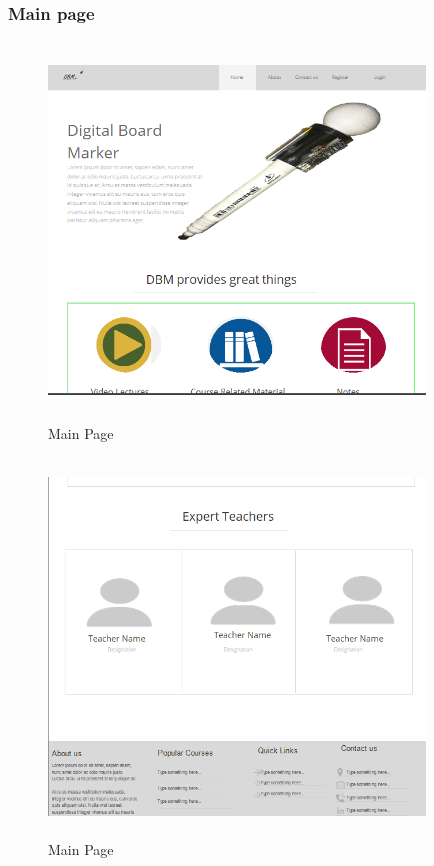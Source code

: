 \documentclass[12pt]{article}
\begin{document}
\subsubsection{Main page}
\begin{figure}[h]
  \centering
  \includegraphics[width=10cm, height=10cm]{MainPage(1)}
  \caption{Main Page}
\end{figure}
\newpage
\begin{figure}[h]
  \centering
  \includegraphics[width=10cm, height=10cm]{MainPage(2)}
  \caption{Main Page}
\end{figure}
\end{document}
